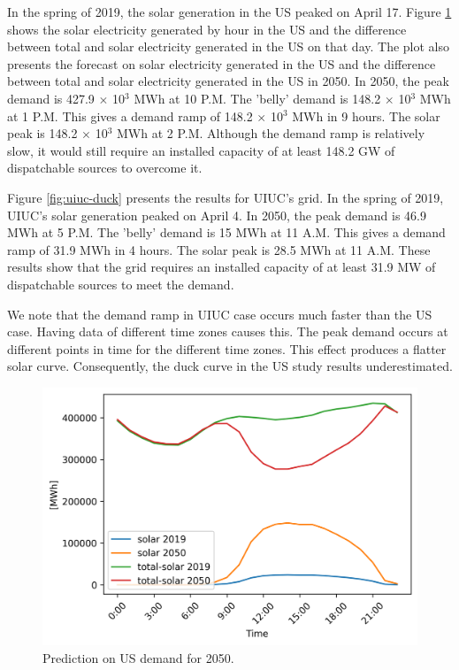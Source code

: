 \documentclass{anstrans}
\begin{document}
In the spring of 2019, the solar generation in the \gls{US} peaked on April 17.
Figure \ref{fig:us-duck} shows the solar electricity generated by hour in the \gls{US} and the difference between total and solar electricity generated in the \gls{US} on that day.
The plot also presents the forecast on solar electricity generated in the \gls{US} and the difference between total and solar electricity generated in the \gls{US} in 2050.
In 2050, the peak demand is 427.9 $\times$ 10$^3$ MWh at 10 P.M.
The 'belly' demand is 148.2 $\times$ 10$^3$ MWh at 1 P.M.
This gives a demand ramp of 148.2 $\times$ 10$^3$ MWh in 9 hours.
The solar peak is 148.2 $\times$ 10$^3$ MWh at 2 P.M.
Although the demand ramp is relatively slow, it would still require an installed capacity of at least 148.2 GW of dispatchable sources to overcome it.

Figure \ref{fig:uiuc-duck} presents the results for UIUC's grid.
In the spring of 2019, UIUC's solar generation peaked on April 4.
In 2050, the peak demand is 46.9 MWh at 5 P.M.
The 'belly' demand is 15 MWh at 11 A.M.
This gives a demand ramp of 31.9 MWh in 4 hours.
The solar peak is 28.5 MWh at 11 A.M.
These results show that the grid requires an installed capacity of at least 31.9 MW of dispatchable sources to meet the demand.

We note that the demand ramp in \gls{UIUC} case occurs much faster than the \gls{US} case.
Having data of different time zones causes this.
The peak demand occurs at different points in time for the different time zones.
This effect produces a flatter solar curve.
Consequently, the duck curve in the \gls{US} study results underestimated.

\begin{figure}[htbp!]
	\centering
	\includegraphics[width=1.0\linewidth]{figures/duck-curve4.png}
	\hfill
	\caption{Prediction on US demand for 2050.}
	\label{fig:us-duck}
\end{figure}
\end{document}
